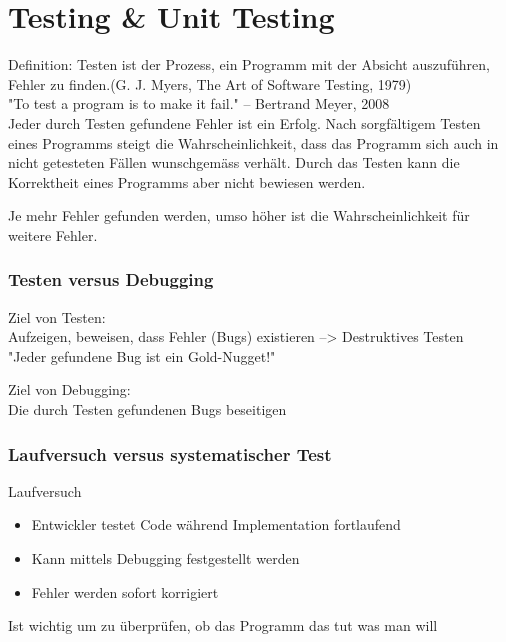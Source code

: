 \chapter{Testing \& Unit Testing}
Definition:
Testen ist der Prozess, ein Programm mit der Absicht auszuführen, Fehler zu finden.(G. J. Myers, The Art of Software Testing, 1979)\\
"To test a program is to make it fail." – Bertrand Meyer, 2008 \\
Jeder durch Testen gefundene Fehler ist ein Erfolg. Nach sorgfältigem Testen eines Programms steigt die Wahrscheinlichkeit, dass das Programm sich auch in nicht getesteten Fällen wunschgemäss verhält. Durch das Testen kann die Korrektheit eines Programms aber nicht bewiesen werden.

Je mehr Fehler gefunden werden, umso 
höher ist die Wahrscheinlichkeit für weitere 
Fehler.
\begin{figure}[hb]
	\centering
\end{figure}


\subsection{Testen versus Debugging}
Ziel von Testen: \\
Aufzeigen, beweisen, dass Fehler (Bugs) 
existieren --> Destruktives Testen \\
"Jeder gefundene Bug ist ein Gold-Nugget!"

Ziel von Debugging: \\
Die durch Testen gefundenen Bugs beseitigen

\subsection{Laufversuch versus systematischer Test}
Laufversuch
\begin{itemize}
	\item Entwickler testet Code während Implementation 
	fortlaufend
	\item Kann mittels Debugging festgestellt werden
	\item Fehler werden sofort korrigiert
\end{itemize}
	Ist wichtig um zu überprüfen, ob das Programm 
das tut was man will

